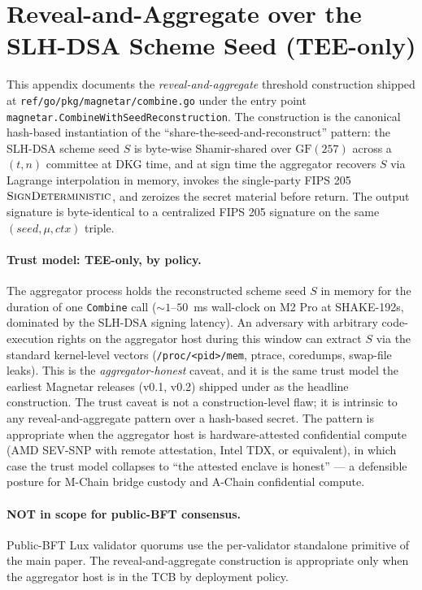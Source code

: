 \section{Reveal-and-Aggregate over the SLH-DSA Scheme Seed (TEE-only)}
\label{app:reveal}

This appendix documents the \emph{reveal-and-aggregate} threshold
construction shipped at \texttt{ref/go/pkg/magnetar/combine.go} under
the entry point
\texttt{magnetar.CombineWithSeedReconstruction}. The construction is
the canonical hash-based instantiation of the
``share-the-seed-and-reconstruct'' pattern: the SLH-DSA scheme seed
$S$ is byte-wise Shamir-shared over $\mathrm{GF}(257)$ across a
$(t, n)$ committee at DKG time, and at sign time the aggregator
recovers $S$ via Lagrange interpolation in memory, invokes the
single-party FIPS 205 $\textsc{SignDeterministic}$, and zeroizes the
secret material before return. The output signature is byte-identical
to a centralized FIPS 205 signature on the same
$(\mathit{seed}, \mu, \mathit{ctx})$ triple.

\paragraph{Trust model: TEE-only, by policy.} The aggregator process
holds the reconstructed scheme seed $S$ in memory for the duration of
one \texttt{Combine} call ($\sim 1$--$50$~ms wall-clock on M2 Pro at
SHAKE-192s, dominated by the SLH-DSA signing latency). An adversary
with arbitrary code-execution rights on the aggregator host during
this window can extract $S$ via the standard kernel-level vectors
(\texttt{/proc/<pid>/mem}, ptrace, coredumps, swap-file leaks). This
is the \emph{aggregator-honest} caveat, and it is the same trust
model the earliest Magnetar releases (v0.1, v0.2) shipped under as
the headline construction. The trust caveat is not a
construction-level flaw; it is intrinsic to any reveal-and-aggregate
pattern over a hash-based secret. The pattern is appropriate when
the aggregator host is hardware-attested confidential compute (AMD
SEV-SNP with remote attestation, Intel TDX, or equivalent), in
which case the trust model collapses to ``the attested enclave is
honest'' --- a defensible posture for M-Chain bridge custody and
A-Chain confidential compute.

\paragraph{NOT in scope for public-BFT consensus.} Public-BFT Lux
validator quorums use the per-validator standalone primitive of the
main paper. The reveal-and-aggregate construction is appropriate
only when the aggregator host is in the TCB by deployment policy.


